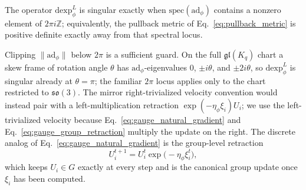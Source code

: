 \begin{proposition}\label{prop:dexp_regularity}
The operator $\mathrm{dexp}^{L}_\phi$ is singular exactly when $\mathrm{spec}(\mathrm{ad}_\phi)$ contains a nonzero element of $2\pi i\mathbb{Z}$; equivalently, the pullback metric of Eq.~\eqref{eq:pullback_metric} is positive definite exactly away from that spectral locus.
\end{proposition}
Clipping $\|\mathrm{ad}_\phi\|$ below $2\pi$ is a sufficient guard. On the full $\mathfrak{gl}(K_q)$ chart a skew frame of rotation angle $\theta$ has $\mathrm{ad}_\phi$-eigenvalues $0$, $\pm i\theta$, and $\pm 2i\theta$, so $\mathrm{dexp}^{L}_\phi$ is singular already at $\theta = \pi$; the familiar $2\pi$ locus applies only to the chart restricted to $\mathfrak{so}(3)$. The mirror right-trivialized velocity convention would instead pair with a left-multiplication retraction $\exp(-\eta_\phi\xi_i)U_i$; we use the left-trivialized velocity because Eq.~\eqref{eq:gauge_natural_gradient} and Eq.~\eqref{eq:gauge_group_retraction} multiply the update on the right. The discrete analog of Eq.~\eqref{eq:gauge_natural_gradient} is the group-level retraction
\begin{equation}
U_i^{t+1} = U_i^t \exp\big(-\eta_\phi \xi_i^t\big),
\label{eq:gauge_group_retraction}
\end{equation}
which keeps $U_i \in G$ exactly at every step and is the canonical group update once $\xi_i$ has been computed.

